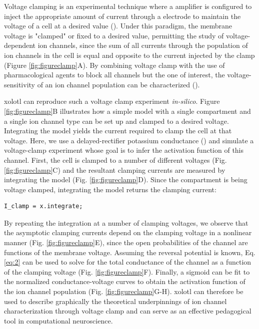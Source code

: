 \documentclass{frontiersSCNS} %
\begin{document}
Voltage clamping is an experimental technique where a amplifier is configured to inject the appropriate amount of current through a electrode to maintain the voltage of a cell at a desired value (\cite{dayanTheoreticalNeuroscience2001}). Under this paradigm, the membrane voltage is "clamped" or fixed to a desired value, permitting the study of voltage-dependent ion channels, since the sum of all currents through the population of ion channels in the cell is equal and opposite to the current injected by the clamp (Figure \ref{fig:figureclamp}A). By combining voltage clamp with the use of pharmacological agents to block all channels but the one of interest, the voltage-sensitivity of an ion channel population can be characterized (\cite{coleIonicCurrentMeasurements1960, coleIonsPotentialsNerve1955, hodgkinEffectSodiumIons1949, hodgkinMeasurementCurrentvoltageRelations1952, hodgkinQuantitativeDescriptionMembrane1952, turrigianoSelectiveRegulationCurrent1995}).

xolotl can reproduce such a voltage clamp experiment \textit{in-silico}. Figure \ref{fig:figureclamp}B illustrates how a simple model with a single compartment and a single ion channel type can be set up and clamped to a desired voltage.  Integrating the model yields the current required to clamp the cell at that voltage. Here, we use a delayed-rectifier potassium conductance (\cite{liuModelNeuronActivityDependent1998}) and simulate a voltage-clamp experiment whose goal is to infer the activation function of this channel. First, the cell is clamped to a number of different voltages (Fig. \ref{fig:figureclamp}C) and the resultant clamping currents are measured by integrating the model (Fig. \ref{fig:figureclamp}D). Since the compartment is being voltage clamped, integrating the model returns the clamping current:

\begin{lstlisting}[style=Matlab-editor]
I_clamp = x.integrate;
\end{lstlisting}


By repeating the integration at a number of clamping voltages, we observe that the asymptotic clamping currents depend on the clamping voltage in a nonlinear manner (Fig. \ref{fig:figureclamp}E), since the open probabilities of the channel are functions of the membrane voltage. Assuming the reversal potential is known, Eq. \eqref{eq:2} can be used to solve for the total conductance of the channel as a function of the clamping voltage (Fig. \ref{fig:figureclamp}F). Finally, a sigmoid can be fit to the normalized conductance-voltage curves to obtain the activation function of the ion channel population (Fig. \ref{fig:figureclamp}G-H). xolotl can therefore be used to describe graphically the theoretical underpinnings of ion channel characterization through voltage clamp and can serve as an effective pedagogical tool in computational neuroscience.
\end{document}
